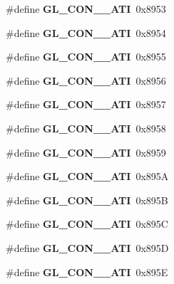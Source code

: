 \begin{DoxyCompactItemize}
\item 
\#define {\bfseries G\+L\+\_\+\+C\+O\+N\+\_\+\_\+\+A\+T\+I}~0x8953\label{_s_d_l__opengl_8h_a939d82c90eee89f7e09621ee917002f8}

\item 
\#define {\bfseries G\+L\+\_\+\+C\+O\+N\+\_\+\_\+\+A\+T\+I}~0x8954\label{_s_d_l__opengl_8h_a6e47403a44ea898923b08c3abecd28a4}

\item 
\#define {\bfseries G\+L\+\_\+\+C\+O\+N\+\_\+\_\+\+A\+T\+I}~0x8955\label{_s_d_l__opengl_8h_aaa2cb2a99b3513174450dab5bb530cc1}

\item 
\#define {\bfseries G\+L\+\_\+\+C\+O\+N\+\_\+\_\+\+A\+T\+I}~0x8956\label{_s_d_l__opengl_8h_a2fcc0158e7cf782d2dcaab88069a3e44}

\item 
\#define {\bfseries G\+L\+\_\+\+C\+O\+N\+\_\+\_\+\+A\+T\+I}~0x8957\label{_s_d_l__opengl_8h_a8c8408934da9d0cbdb36fde3fae846c5}

\item 
\#define {\bfseries G\+L\+\_\+\+C\+O\+N\+\_\+\_\+\+A\+T\+I}~0x8958\label{_s_d_l__opengl_8h_a1ac54999d967c2500a7689db9b44e85f}

\item 
\#define {\bfseries G\+L\+\_\+\+C\+O\+N\+\_\+\_\+\+A\+T\+I}~0x8959\label{_s_d_l__opengl_8h_a3a9f5ff32cf9b3e5fdfc9450735b7500}

\item 
\#define {\bfseries G\+L\+\_\+\+C\+O\+N\+\_\+\_\+\+A\+T\+I}~0x895\+A\label{_s_d_l__opengl_8h_ad5755703bfe6913ffbeea9b30fd3430d}

\item 
\#define {\bfseries G\+L\+\_\+\+C\+O\+N\+\_\+\_\+\+A\+T\+I}~0x895\+B\label{_s_d_l__opengl_8h_a7a8a47c80fe06f9a346b19d693ae89b0}

\item 
\#define {\bfseries G\+L\+\_\+\+C\+O\+N\+\_\+\_\+\+A\+T\+I}~0x895\+C\label{_s_d_l__opengl_8h_ab4070dc1dabaf3487bba710ba5eaa6b7}

\item 
\#define {\bfseries G\+L\+\_\+\+C\+O\+N\+\_\+\_\+\+A\+T\+I}~0x895\+D\label{_s_d_l__opengl_8h_a37dd0cd48d8023c3ef3d90ddcdbb6b88}

\item 
\#define {\bfseries G\+L\+\_\+\+C\+O\+N\+\_\+\_\+\+A\+T\+I}~0x895\+E\label{_s_d_l__opengl_8h_a93e8eb0ed3ee27aa951729516f3227bf}


\end{DoxyCompactItemize}
